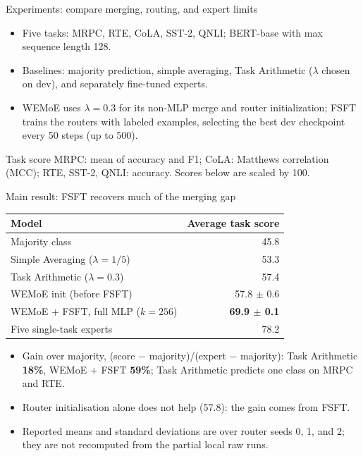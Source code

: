 \documentclass[aspectratio=169,10pt]{beamer}
\begin{document}
\begin{frame}{Experiments: compare merging, routing, and expert limits}
  \begin{itemize}
    \item Five tasks: MRPC, RTE, CoLA, SST-2, QNLI; BERT-base with max sequence length 128.
    \item Baselines: majority prediction, simple averaging, Task Arithmetic ($\lambda$ chosen on dev), and separately fine-tuned experts.
    \item WEMoE uses $\lambda=0.3$ for its non-MLP merge and router initialization; FSFT trains the routers with labeled examples, selecting the best dev checkpoint every 50 steps (up to 500).
  \end{itemize}
  \vfill
  \begin{block}{Task score}
    MRPC: mean of accuracy and F1; CoLA: Matthews correlation (MCC); RTE, SST-2, QNLI: accuracy. Scores below are scaled by 100.
  \end{block}
\end{frame}

\begin{frame}{Main result: FSFT recovers much of the merging gap}
  \centering
  \begin{tabular}{l r}
    \toprule
    Model & Average task score\\
    \midrule
    Majority class & 45.8\\
    Simple Averaging ($\lambda=1/5$) & 53.3\\
    Task Arithmetic ($\lambda=0.3$) & 57.4\\
    WEMoE init (before FSFT) & 57.8 $\pm$ 0.6\\
    WEMoE + FSFT, full MLP ($k=256$) & \textbf{69.9 $\pm$ 0.1}\\
    Five single-task experts & 78.2\\
    \bottomrule
  \end{tabular}
  \vfill
  \begin{itemize}
    \item Gain over majority, (score $-$ majority)/(expert $-$ majority): Task Arithmetic \textbf{18\%}, WEMoE + FSFT \textbf{59\%}; Task Arithmetic predicts one class on MRPC and RTE.
    \item Router initialisation alone does not help (57.8): the gain comes from FSFT.
    \item Reported means and standard deviations are over router seeds 0, 1, and 2; they are not recomputed from the partial local raw runs.
  \end{itemize}
\end{frame}
\end{document}
